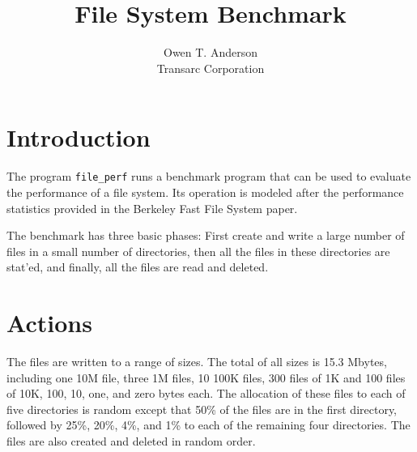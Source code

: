 % 
%
% 
% 
% 

\title{File System Benchmark}
\author{Owen T. Anderson \\ Transarc Corporation}


\maketitle
\section{Introduction}

The program {\tt file_perf} runs a benchmark program that can be used to
evaluate the performance of a file system.  Its operation is modeled
after the performance statistics provided in the Berkeley Fast File
System paper\cite{unix-ffs}.

The benchmark has three basic phases: First create and write a large
number of files in a small number of directories, then all the files in
these directories are stat'ed, and finally, all the files are read and
deleted.

\section{Actions}

The files are written to a range of sizes.  The total of all sizes is
15.3 Mbytes, including one 10M file, three 1M files, 10 100K files, 300
files of 1K and 100 files of 10K, 100, 10, one, and zero bytes each.
The allocation of these files to each of five directories is random
except that 50\% of the files are in the first directory, followed by
25\%, 20\%, 4\%, and 1\% to each of the remaining four directories.  The
files are also created and deleted in random order.

